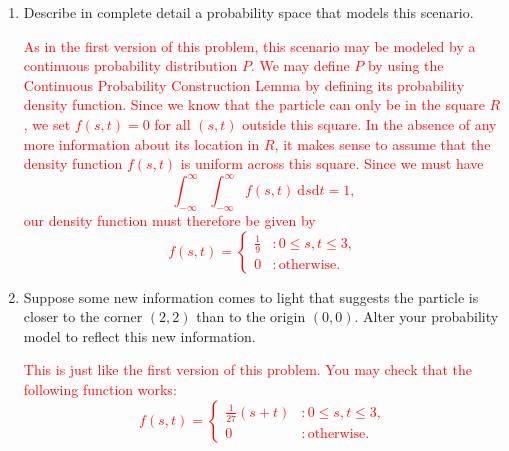 \documentclass[12pt,reqno]{amsart}
\begin{document}
\medskip
\begin{enumerate}
\item Describe in complete detail a probability space that models this scenario.

\bigskip
\textcolor{red}{As in the first version of this problem, this scenario may be modeled by a continuous probability distribution $P$. We may define $P$ by using the Continuous Probability Construction Lemma by defining its probability density function. Since we know that the particle can only be in the square $R$, we set $f(s,t)=0$ for all $(s,t)$ outside this square. In the absence of any more information about its location in $R$, it makes sense to assume that the density function $f(s,t)$ is uniform across this square. Since we must have
	\[
	\int_{-\infty}^\infty \int_{-\infty}^\infty f(s,t) \ \text{d} s \text{d}t =1,
	\]
our density function must therefore be given by
	\[
	f(s,t) = \begin{cases} \frac{1}{9} & : 0 \leq s,t \leq 3, \\
	0 & : \text{otherwise}.\end{cases}
	\]}
\bigskip

\item Suppose some new information comes to light that suggests the particle is closer to the corner $(2,2)$ than to the origin $(0,0)$. Alter your probability model to reflect this new information.
    
\bigskip
\textcolor{red}{This is just like the first version of this problem. You may check that the following function works:
        \[
        f(s,t) = \begin{cases}
	\frac{1}{27}(s+t) & : 0 \leq s,t \leq 3, \\
	0 & : \text{otherwise}.
	\end{cases}
	\]}
\end{enumerate}
\end{document}
